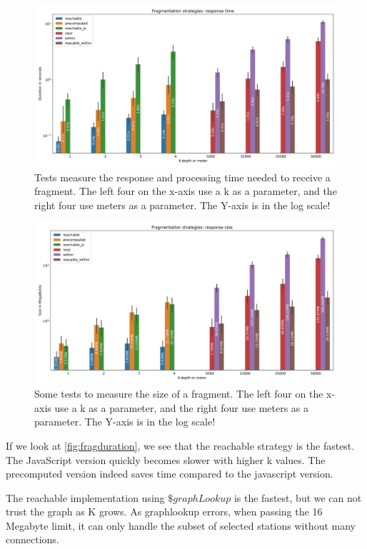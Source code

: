 \begin{figure}[H]
    \centering
    \includegraphics[width=\textwidth]{images/fragmentsbyduration.png}
    \caption{Tests measure the response and processing time needed to receive a fragment. The left four on the x-axis use a k as a parameter, and the right four use meters as a parameter. The Y-axis is in the log scale!}
    \label{fig:fragduration}
\end{figure}
\begin{figure}[H]
    \centering
    \includegraphics[width=\textwidth]{images/fragmentsbysize.png}
    \caption{Some tests to measure the size of a fragment. The left four on the x-axis use a k as a parameter, and the right four use meters as a parameter. The Y-axis is in the log scale!}
    \label{fig:fragsize}
\end{figure}


If we look at \autoref{fig:fragduration}, we see that the reachable strategy is the fastest. The JavaScript version quickly becomes slower with higher k values. The precomputed version indeed saves time compared to the javascript version. 

The reachable implementation using $\$graphLookup$ is the fastest, but we can not trust the graph as K grows. As graphlookup errors, when passing the 16 Megabyte limit, it can only handle the subset of selected stations without many connections. 

